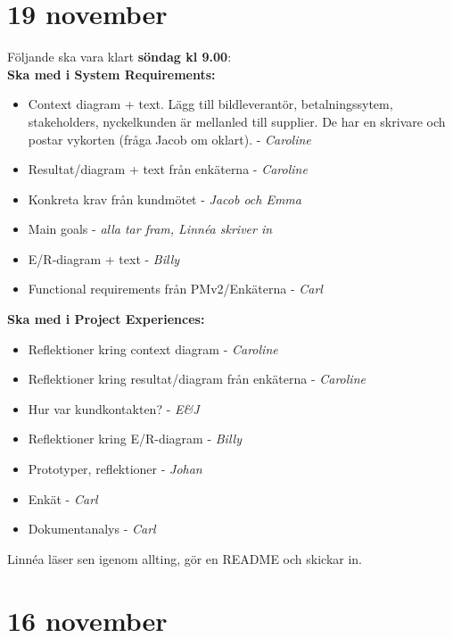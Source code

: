 \documentclass[10pt,a4paper]{article}
\author{Linnéa Claesson}
\begin{document}
\section*{19 november}
{\Large Följande ska vara klart \textbf{söndag kl 9.00}:}\\

\textbf{Ska med i System Requirements:}
\begin{itemize}
\item Context diagram + text. Lägg till bildleverantör, betalningssytem, stakeholders, nyckelkunden är mellanled till supplier. De har en skrivare och postar vykorten (fråga Jacob om oklart). - \textit{Caroline}
\item Resultat/diagram + text från enkäterna - \textit{Caroline}
\item Konkreta krav från kundmötet - \textit{Jacob och Emma}
\item Main goals - \textit{alla tar fram, Linn\'ea skriver in}
\item E/R-diagram + text - \textit{Billy}
\item Functional requirements från PMv2/Enkäterna - \textit{Carl}

\end{itemize}

\textbf{Ska med i Project Experiences:}
\begin{itemize}
\item Reflektioner kring context diagram - \textit{Caroline}
\item Reflektioner kring resultat/diagram från enkäterna - \textit{Caroline}
\item Hur var kundkontakten? - \textit{E\&J}
\item Reflektioner kring E/R-diagram - \textit{Billy}
\item Prototyper, reflektioner - \textit{Johan}
\item Enkät - \textit{Carl}
\item Dokumentanalys - \textit{Carl}

\end{itemize}

Linnéa läser sen igenom allting, gör en README och skickar in.

\section*{16 november}
\end{document}
